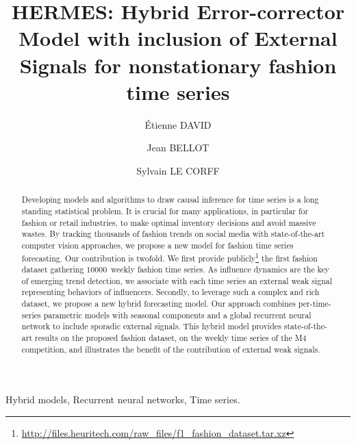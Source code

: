 \documentclass[review]{elsarticle}
\newcommand{\numberts}{10000}
\begin{document}
\begin{frontmatter}

\title{HERMES: Hybrid Error-corrector Model with inclusion of External Signals for nonstationary fashion time series}

\author[mymainaddress,mysecondaryaddress]{\'Etienne DAVID }

\author[mysecondaryaddress]{Jean BELLOT}

\author[mymainaddress]{Sylvain LE CORFF} 

\address[mymainaddress]{\small  Samovar, T\'el\'ecom SudParis,  D\'epartement CITI, Institut Polytechnique de Paris, 9 rue Charles Fourier, 91011 EVRY, France.}
\address[mysecondaryaddress]{Heuritech, 71 Rue Réaumur, 75002 PARIS, France.}

\begin{abstract}
Developing models and algorithms to draw causal inference for time series is a long standing statistical problem. It is crucial for many applications, in particular for fashion or retail industries, to make optimal inventory decisions and avoid massive wastes. By tracking thousands of fashion trends on social media with state-of-the-art computer vision approaches, we propose a new model for fashion time series forecasting. Our contribution is  twofold. We first provide publicly\footnote[1]{\url{http://files.heuritech.com/raw_files/f1_fashion_dataset.tar.xz}} the first fashion dataset gathering \numberts\ weekly fashion time series. As influence dynamics are the key of emerging trend detection, we associate with each time series an external weak signal representing behaviors of influencers. Secondly, to leverage such a complex and rich dataset, we propose a new hybrid forecasting model. Our approach combines per-time-series parametric models with seasonal components and a global recurrent neural network to include sporadic external signals. This hybrid model provides state-of-the-art results on the proposed fashion dataset, on the weekly time series of the M4 competition, and illustrates the benefit of the contribution of external weak signals.
\end{abstract}

\begin{keyword}
Hybrid models, Recurrent neural networks, Time series.
\end{keyword}

\end{frontmatter}
\end{document}
